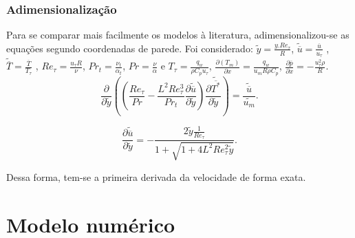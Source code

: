 \documentclass[xcolor=dvipsnames,10pt,aspectratio=169]{beamer}
\begin{document}
	
	
	
	
	
		\begin{frame}
			\frametitle{Adimensionalização}
			Para se comparar mais facilmente os modelos à literatura, adimensionalizou-se as equações segundo coordenadas de parede. Foi considerado: $ \tilde{y} = \frac{y . Re_\tau}{R} $, $ \tilde{\overline{u}} = \frac{\overline{u}}{u_\tau} $ , $ \tilde{\overline{T}} = \frac{\overline{T}}{T_\tau} $ , $Re_\tau = \frac{u_\tau R}{\nu}$, $Pr_t = \frac{\nu_t}{\alpha_t}$, $Pr = \frac{\nu}{\alpha}$ e $T_\tau = \frac{q_w}{\rho C_p u_\tau}$, $\frac{\partial{\left(T_m\right)}}{\partial{x}} = \frac{q_w}{u_m  R \rho  C_p } $, $\frac{\partial \overline{p}}{\partial x} = - \frac{u_\tau^2 \rho}{R} $.
			\\
				\begin{equation}
				{\frac{\partial{}}{\partial{\tilde{y}}}} \left( \left( \frac{Re_\tau}{Pr}   
				- \frac{{L}^2 Re_\tau ^3}{Pr_t}\frac{\partial \tilde{\overline{u}}}{\partial \tilde{y}} \right) \frac{\partial \tilde{\overline{T^\ast}}}{\partial \tilde{y}} \right)
				= 
				\frac{\tilde{\overline{u}}}{\tilde{u_m}}.
				\end{equation}

				\begin{equation}
				\frac{\partial \tilde{\overline{u}}}{\partial \tilde{y}} = - \frac{2 \tilde{y} \frac{1}{Re_\tau} }{ 1 + \sqrt{ 1 + 4 L ^2 Re_\tau ^2 \tilde{y}}}.
				\end{equation}	
				
			Dessa forma, tem-se a primeira derivada da velocidade de forma exata.
		\end{frame}
	
	
	

	
	
	\section{Modelo numérico}
		
	
	
	
		
\end{document}
